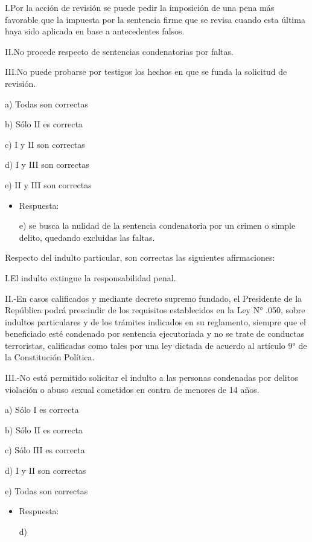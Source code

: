 \documentclass[letterpaper, 11pt]{article}
\begin{document}
I.Por la acción de revisión se puede pedir la imposición de una pena
más favorable que la impuesta por la sentencia firme que se revisa
cuando esta última haya sido aplicada en base a antecedentes falsos.



II.No procede respecto de sentencias condenatorias por faltas.



III.No puede probarse por testigos los hechos en que se funda la
solicitud de revisión.


a) Todas son correctas

b) Sólo II es correcta

c) I y II son correctas

d) I y III son correctas

e) II y III son correctas


\begin{itemize}
\item Respuesta:

e) se busca la nulidad de la sentencia condenatoria por un crimen o
simple delito, quedando excluidas las faltas.
\end{itemize}



Respecto del indulto particular, son correctas las siguientes
afirmaciones:


I.El indulto extingue la responsabilidad penal.



II.-En casos calificados y mediante decreto supremo fundado, el
Presidente de la República podrá prescindir de los requisitos
establecidos en la Ley N° .050, sobre indultos particulares y de los
trámites indicados en su reglamento, siempre que el beneficiado esté
condenado por sentencia ejecutoriada y no se trate de conductas
terroristas, calificadas como tales por una ley dictada de acuerdo al
artículo 9° de la Constitución Política.



III.-No está permitido solicitar el indulto a las personas condenadas
por delitos violación o abuso sexual cometidos en contra de menores de
14 años.


a) Sólo I es correcta

b) Sólo II es correcta

c) Sólo III es correcta

d) I y II son correctas

e) Todas son correctas


\begin{itemize}
\item Respuesta:

d)
\end{itemize}
\end{document}
